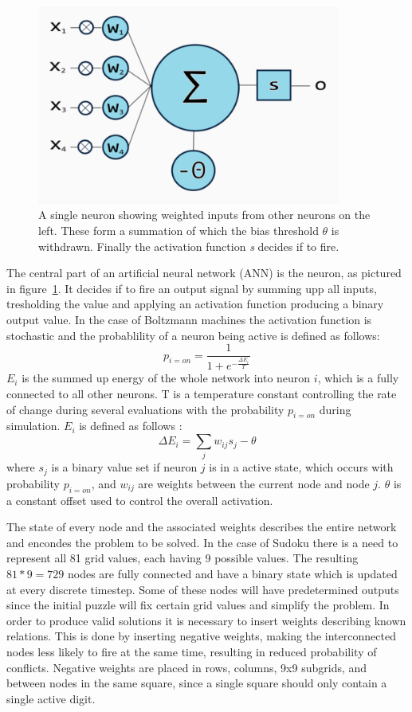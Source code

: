 \documentclass[a4paper,11pt]{kth-mag}
\begin{document}
\begin{figure}[here] 
\centering
\includegraphics[width=10cm]{images/neuron.png}
\caption{A single neuron showing weighted inputs from other neurons on the left. These form a summation of which the bias threshold $\theta$ is withdrawn. Finally the activation function \emph{s} decides if to fire.}
\label{fig:neural-Neuron}
\end{figure}
The central part of an artificial neural network (ANN) is the neuron, as pictured in figure~\ref{fig:neural-Neuron}.
It decides if to fire an output signal by summing upp all inputs, tresholding the value and applying an activation function producing a binary output value.
In the case of Boltzmann machines the activation function is stochastic and the probablility of a neuron being active is defined as follows:
\[
p_{i=on} = \frac{1}{1+e^{-\frac{\Delta E_{i}}{T}}}
\]
$E_i$ is the summed up energy of the whole network into neuron $i$, which is a fully connected to all other neurons.
T is a temperature constant controlling the rate of change during several evaluations with the probability $p_{i=on}$ during simulation.
$E_i$ is defined as follows \cite{boltzmann2}:
\[
\Delta E_{i} = \sum_{j} w_{ij} s_{j} - \theta
\]
where $s_j$ is a binary value set if neuron $j$ is in a active state, which occurs with probability $p_{i=on}$, and $w_{ij}$ are weights between the current node and node $j$. $\theta$ is a constant offset used to control the overall activation.

The state of every node and the associated weights describes the entire network and encondes the problem to be solved.
In the case of Sudoku there is a need to represent all 81 grid values, each having 9 possible values.
The resulting $81*9=729$ nodes are fully connected and have a binary state which is updated at every discrete timestep.
Some of these nodes will have predetermined outputs since the initial puzzle will fix certain grid values and simplify the problem.
In order to produce valid solutions it is necessary to insert weights describing known relations.
This is done by inserting negative weights, making the interconnected nodes less likely to fire at the same time, resulting in reduced probability of conflicts.
Negative weights are placed in rows, columns, 9x9 subgrids, and between nodes in the same square, since a single square should only contain a single active digit.\\
\end{document}
